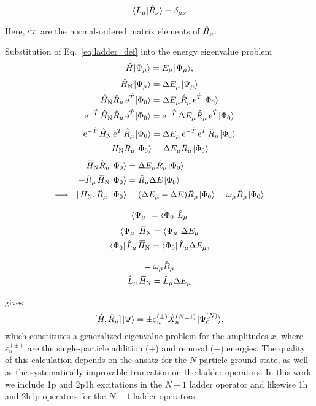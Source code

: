 \documentclass[thesis.tex]{subfiles}
\begin{document}
\begin{equation}
  \langle \hat{L}\hspace{-0.1pt}_{\mu} | \hat{R}\hspace{-0.1pt}_{\nu}\rangle = \delta_{\mu\nu}
\end{equation}

Here, ${}^{\mu}r^{}_{}$ are the normal-ordered matrix elements of $\hat{R}\hspace{-0.1pt}_{\mu}$.

Substitution of Eq.\ \eqref{eq:ladder_def} into the energy eigenvalue problem
\begin{equation}
  \Ham\ket{\Psi_{\mu}} = E_{\mu}\ket{\Psi_{\mu}},
\end{equation}
\begin{gather}
  \hat{H}_{\mathrm{N}}\hspace{1pt}\lvert \Psi_{\mu} \rangle = \Delta E_{\mu}\hspace{1pt}\lvert \Psi_{\mu} \rangle \notag \\
  \hat{H}_{\mathrm{N}}\hat{R}\hspace{-0.1pt}_{\mu}\operatorname{e}^{\hat{T}\hspace{-0.25pt}}\hspace{1pt}\lvert \Phi_{0} \rangle = \Delta E_{\mu}\hat{R}\hspace{-0.1pt}_{\mu}\operatorname{e}^{\hat{T}\hspace{-0.25pt}}\hspace{1pt}\lvert \Phi_{0} \rangle \notag \\
  \operatorname{e}^{-\hat{T}\hspace{-0.25pt}}\hat{H}_{\mathrm{N}}\hat{R}\hspace{-0.1pt}_{\mu}\operatorname{e}^{\hat{T}\hspace{-0.25pt}}\hspace{1pt}\lvert \Phi_{0} \rangle = \operatorname{e}^{-\hat{T}\hspace{-0.25pt}}\Delta E_{\mu}\hat{R}\hspace{-0.1pt}_{\mu}\operatorname{e}^{\hat{T}\hspace{-0.25pt}}\hspace{1pt}\lvert \Phi_{0} \rangle
\end{gather}
\begin{gather}
  \E^{-\Top}\HamN\E^{\Top}\Rop_{\mu}\refket = \Ecorr_{\mu}\E^{-\Top}\E^{\Top}\Rop_{\mu}\refket \notag \\
  \EHamN\Rop_{\mu}\refket = \Ecorr_{\mu}\Rop_{\mu}\refket
\end{gather}
\begin{align}
  \EHamN\Rop_{\mu}\refket &= \Ecorr_{\mu}\Rop_{\mu}\refket \notag \\
  -\Rop_{\mu}\EHamN\refket &= \Rop_{\mu}\Ecorr\refket \notag \\
  \longrightarrow\ \ [\EHamN,\Rop_{\mu}]\refket &= (\Ecorr_{\mu} - \Ecorr)\Rop_{\mu}\refket = \omega_{\mu}\Rop_{\mu}\refket
\end{align}


\begin{equation}\label{eq:ladder_def}
  \langle \Psi_{\mu} |\hspace{1pt} = \langle \Phi_{0} |\hspace{1pt}\hat{L}\hspace{-0.1pt}_{\mu}
\end{equation}
\begin{gather}
  \bra{\Psi_{\mu}}\EHamN = \bra{\Psi_{\mu}}\Ecorr_{\mu} \notag \\
  \refbra\Lop_{\mu}\EHamN = \refbra\Lop_{\mu}\Ecorr_{\mu},
\end{gather}


\begin{gather}
  [\EHamN,\Rop_{\mu}] = \omega_{\mu}\Rop_{\mu} \notag \\
  \Lop_{\mu}\EHamN = \Lop_{\mu}\Ecorr_{\mu}
\end{gather}


gives
\begin{equation}\label{eq:EOM}
  [\hat{H}\hspace{-1pt}, \hat{R}\hspace{-0.1pt}_{\mu}] \hspace{1pt}\lvert \Psi \rangle = \pm \varepsilon^{(\pm)}_u \hat{X}^{(N \pm 1)}_u \hspace{1pt}\lvert \Psi^{(N)}_0 \rangle,
\end{equation}
which constitutes a generalized eigenvalue problem for the amplitudes $x$, where $\varepsilon^{(\pm)}_u$ are the single-particle addition ($+$) and removal ($-$) energies. The quality of this calculation depends on the ansatz for the $N$-particle ground state, as well as the systematically improvable truncation on the ladder operators. In this work we include 1p and 2p1h excitations in the $N + 1$ ladder operator and likewise 1h and 2h1p operators for the $N - 1$ ladder operators.
\end{document}
